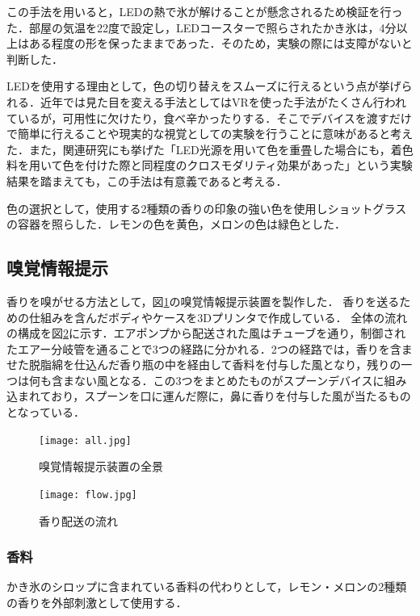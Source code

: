 この手法を用いると，LEDの熱で氷が解けることが懸念されるため検証を行った．部屋の気温を22度で設定し，LEDコースターで照らされたかき氷は，4分以上はある程度の形を保ったままであった．そのため，実験の際には支障がないと判断した．


LEDを使用する理由として，色の切り替えをスムーズに行えるという点が挙げられる．近年では見た目を変える手法としてはVRを使った手法がたくさん行われているが，可用性に欠けたり，食べ辛かったりする．そこでデバイスを渡すだけで簡単に行えることや現実的な視覚としての実験を行うことに意味があると考えた．また，関連研究にも挙げた「LED光源を用いて色を重畳した場合にも，着色料を用いて色を付けた際と同程度のクロスモダリティ効果があった」という実験結果を踏まえても，この手法は有意義であると考える．

色の選択として，使用する2種類の香りの印象の強い色を使用しショットグラスの容器を照らした．レモンの色を黄色，メロンの色は緑色とした．

\subsection{嗅覚情報提示}
香りを嗅がせる方法として，図\ref{all}の嗅覚情報提示装置を製作した．
香りを送るための仕組みを含んだボディやケースを3Dプリンタで作成している．
全体の流れの構成を図\ref{flow}に示す．エアポンプから配送された風はチューブを通り，制御されたエアー分岐管を通ることで3つの経路に分かれる．2つの経路では，香りを含ませた脱脂綿を仕込んだ香り瓶の中を経由して香料を付与した風となり，残りの一つは何も含まない風となる．この3つをまとめたものがスプーンデバイスに組み込まれており，スプーンを口に運んだ際に，鼻に香りを付与した風が当たるものとなっている．


\begin{figure}[t]
  \texttt{[image: all.jpg]}
  \caption{嗅覚情報提示装置の全景}
  \label{all}
\end{figure}

\begin{figure}[t]
  \texttt{[image: flow.jpg]}
  \caption{香り配送の流れ}
  \label{flow}
\end{figure}


\subsubsection{香料}
かき氷のシロップに含まれている香料の代わりとして，レモン・メロンの2種類の香りを外部刺激として使用する．

